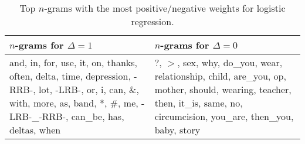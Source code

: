 \documentclass[11pt,a4paper]{article}
\begin{document}
\begin{table}[t]
	\centering
    \begin{tabularx}{\linewidth}{XX} \toprule
    $n$-grams for $\Delta = 1$ & $n$-grams for $\Delta = 0$ \\ \midrule
 	and, in, for, use, it, on, thanks, often, delta, time, depression, -RRB-, lot, -LRB-, or, i, can, \&, with, more, as, band, *, \#, me, - LRB-\_-RRB-, can\_be, has, deltas, when & ?, $>$,  sex, why, do\_you, wear, relationship, child, are\_you, op, mother, should, wearing, teacher, then, it\_is, same, no, circumcision, you\_are, then\_you, baby, story \\ \bottomrule
	\end{tabularx}
    \caption{Top $n$-grams with the most positive/negative weights for logistic regression.\label{tab:lr_features}}
\end{table}
\end{document}
